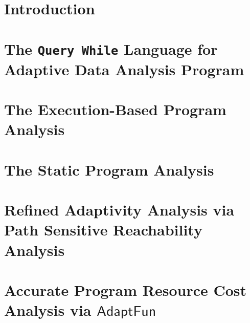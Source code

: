 \documentclass[12pt, letterpaper]{report}   %
\newcommand{\THESYSTEM}{\textsf{AdaptFun}}
\begin{document}

\newpage
\endofprelim
\cleardoublepage





\chapter{Introduction}
\label{introduction}

\cleardoublepage


\chapter{The {\tt Query While} Language for Adaptive Data Analysis Program}
\label{ch:language}

\cleardoublepage

\chapter{The Execution-Based Program Analysis}
\label{ch:dynamic}

\cleardoublepage

\chapter{The Static Program Analysis}
\label{ch:static}

\cleardoublepage

% 

\chapter{Refined Adaptivity Analysis via Path Sensitive Reachability Analysis}
\label{ch:improved}

\cleardoublepage

\chapter{Accurate Program Resource Cost Analysis via $\THESYSTEM$}
\label{ch:generalization}

\end{document}
